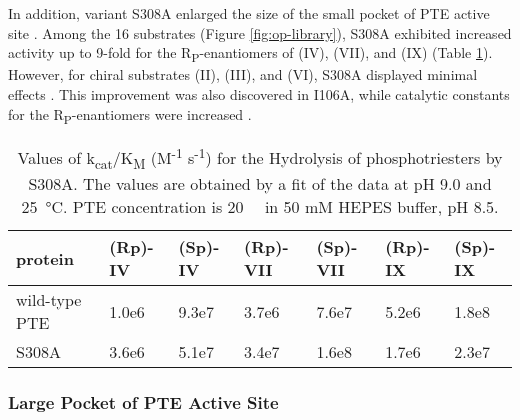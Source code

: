 \begin{refsection}
In addition, variant S308A enlarged the size of the small pocket of PTE active site
\cite{Chen-Goodspeed2001a}. Among the 16 substrates (Figure
\ref{fig:op-library}), S308A exhibited increased activity up to 9-fold for
the R\textsubscript{P}-enantiomers of (IV), (VII), and (IX) (Table
\ref{tab:pte-s308a}). However, for chiral substrates (II), (III), and (VI),
S308A displayed minimal effects \cite{Chen-Goodspeed2001a,Jeong2014a}. This
improvement was also discovered in I106A, while catalytic constants for the
R\textsubscript{P}-enantiomers were increased \cite{Chen-Goodspeed2001a}.
\begin{table}[htbp]
    \centering
    \caption[Values of k\textsubscript{cat}/K\textsubscript{M}
    (M\textsuperscript{-1} s\textsuperscript{-1}) for the Hydrolysis of
    phosphotriesters by S308A. The values are obtained by a fit of the data at pH
    9.0 and \SI{25}{\celsius}. PTE concentration is \SI{20}{\nano\Molar} in 50
    mM HEPES buffer, pH 8.5.] {Values of
        k\textsubscript{cat}/K\textsubscript{M} (M\textsuperscript{-1}
        s\textsuperscript{-1}) for the Hydrolysis of phosphotriesters by S308A.
        The values are obtained by a fit of the data at pH 9.0 and
        \SI{25}{\celsius}. PTE concentration is \SI{20}{\nano\Molar} in 50 mM
        HEPES buffer, pH 8.5.}
    \begin{tabular}{lllllll}
    \hline

    protein & (Rp)-IV & (Sp)-IV & (Rp)-VII & (Sp)-VII & (Rp)-IX & (Sp)-IX \\
    \hline

    wild-type PTE & 1.0e6 & 9.3e7 & 3.7e6 & 7.6e7 & 5.2e6 & 1.8e8 \\
    S308A & 3.6e6 & 5.1e7 & 3.4e7 & 1.6e8 & 1.7e6 & 2.3e7 \\

    \hline  
    \end{tabular}
    \label{tab:pte-s308a}
\end{table}

\subsubsection{Large Pocket of PTE Active Site}


\end{refsection}
